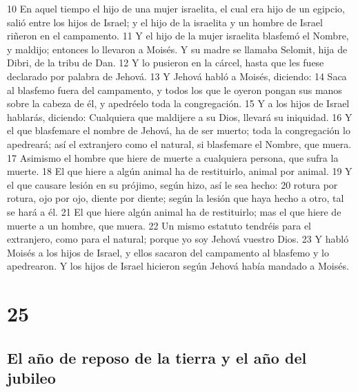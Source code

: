 10 En aquel tiempo el hijo de una mujer israelita, el cual era hijo de un egipcio, salió entre los hijos de Israel; y el hijo de la israelita y un hombre de Israel riñeron en el campamento.
11 Y el hijo de la mujer israelita blasfemó el Nombre, y maldijo; entonces lo llevaron a Moisés. Y su madre se llamaba Selomit, hija de Dibri, de la tribu de Dan.
12 Y lo pusieron en la cárcel, hasta que les fuese declarado por palabra de Jehová.
13 Y Jehová habló a Moisés, diciendo:
14 Saca al blasfemo fuera del campamento, y todos los que le oyeron pongan sus manos sobre la cabeza de él, y apedréelo toda la congregación.
15 Y a los hijos de Israel hablarás, diciendo: Cualquiera que maldijere a su Dios, llevará su iniquidad.
16 Y el que blasfemare el nombre de Jehová, ha de ser muerto; toda la congregación lo apedreará; así el extranjero como el natural, si blasfemare el Nombre, que muera.
17 Asimismo el hombre que hiere de muerte a cualquiera persona, que sufra la muerte.
18 El que hiere a algún animal ha de restituirlo, animal por animal.
19 Y el que causare lesión en su prójimo, según hizo, así le sea hecho:
20 rotura por rotura, ojo por ojo, diente por diente; según la lesión que haya hecho a otro, tal se hará a él.
21 El que hiere algún animal ha de restituirlo; mas el que hiere de muerte a un hombre, que muera.
22 Un mismo estatuto tendréis para el extranjero, como para el natural;  porque yo soy Jehová vuestro Dios.
23 Y habló Moisés a los hijos de Israel, y ellos sacaron del campamento al blasfemo y lo apedrearon. Y los hijos de Israel hicieron según Jehová había mandado a Moisés.

\chapter{25}

\section*{El año de reposo de la tierra y el año del jubileo}

